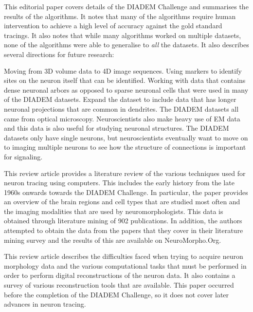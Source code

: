 \documentclass[12pt]{article}
\begin{document}
\begin{enumerate}[label={}]
		This editorial paper covers details of the DIADEM
		Challenge and summarises the results of the
		algorithms. It notes that many of the algorithms
		require human intervention to achieve a high level
		of accuracy against the gold standard tracings. It
		also notes that while many algorithms worked on
		multiple datasets, none of the algorithms were
		able to generalise to \emph{all} the datasets.
		It also describes several directions for future
		research:
		\begin{enumerate}[label={}]
				Moving from 3D volume data to 4D
				image sequences.
				Using markers to identify sites on the
				neuron itself that can be identified.
			 Working with
				data that contains dense neuronal arbors
				as opposed to sparse neuronal cells that
				were used in many of the DIADEM datasets.
				Expand the dataset to include data
				that has longer neuronal
				projections that are common in
				dendrites.
				The DIADEM datasets all came from
				optical microscopy.
				Neuroscientists also make heavy
				use of EM data and this data is
				also useful for studying neuronal
				structures.
				The DIADEM datasets only have
				single neurons, but
				neuroscientists eventually want to
				move on to imaging multiple
				neurons to see how the structure
				of connections is important for
				signaling.
		\end{enumerate}

		This review article provides a literature review
		of the various techniques used for neuron tracing
		using computers. This includes the early history
		from the late 1960s onwards towards the DIADEM
		Challenge. In particular, the paper provides an
		overview of the brain regions and cell types that
		are studied most often and the imaging modalities
		that are used by neuromorphologists. This data is
		obtained through literature mining of 902
		publications. In addition, the authors attempted
		to obtain the data from the papers that they cover
		in their literature mining survey and the results
		of this are available on NeuroMorpho.Org.

		This review article describes the difficulties faced when
		trying to acquire neuron morphology data and the
		various computational tasks that must be
		performed in order to perform digital
		reconstructions of the neuron data. It also
		contains a survey of various reconstruction tools
		that are available. This paper occurred before the
		completion of the DIADEM Challenge, so it does not
		cover later advances in neuron tracing.
\end{enumerate}
\end{document}
